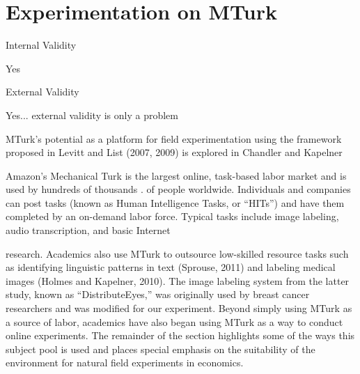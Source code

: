 \documentclass[12pt]{article}
\begin{document}
\citet{Foschi1996}
\citet{Dixon2015}
\citet{Cheng2011}
\citet{Bortolussi2010}
\citet{Borsuk2009}
\citet{Bobbit-Zeher2011}
\citet{Barnes2015}
\citet{Alexander2014}
\citet{Alexander1993}
\citet{Ridgeway1997}
\citet{Yampbell2005}
\citet{VanDijk2014}
\citet{VandenBrink2012}
\citet{Uscinski2011}
\citet{Tregenza2002}
\citet{Top1991}
\citet{Paludi1983}
\citet{Lloyd1990}
\citet{Lena2014}
\citet{Leemans1992}
\citet{Johnston2014}
\citet{Haswell1996}
\citet{Gorman2005}
\citet{Fulton2012}
\citet{Foschi2000}





\section{Experimentation on MTurk}\label{sec:mturk}

Internal Validity

Yes

External Validity

Yes... external validity is only a problem

MTurk’s potential as a platform for field experimentation using the framework proposed in Levitt and List (2007, 2009) is explored in Chandler and Kapelner

Amazon’s Mechanical Turk \citep{MTurkWebsite} is the largest online, task-based labor market and is used by hundreds of thousands \citep{Shank2015}.
of people worldwide. Individuals and companies can post tasks (known as Human Intelligence Tasks, or “HITs”) and have
them completed by an on-demand labor force. Typical tasks include image labeling, audio transcription, and basic Internet

research. Academics also use MTurk to outsource low-skilled resource tasks such as identifying linguistic patterns in text
(Sprouse, 2011) and labeling medical images (Holmes and Kapelner, 2010). The image labeling system from the latter study,
known as “DistributeEyes,” was originally used by breast cancer researchers and was modified for our experiment.
Beyond simply using MTurk as a source of labor, academics have also began using MTurk as a way to conduct online
experiments. The remainder of the section highlights some of the ways this subject pool is used and places special emphasis
on the suitability of the environment for natural field experiments in economics.


\citet{Berinsky2012}
\citet{Buhrmester2011}
\citet{Henrich2010}
\citet{Paolacci2010}
\citet{Gneezy2006}
\citet{Levitt2007}
\citet{Levitt2009}
\citet{Kapelner2010}
\citet{Chandler2013}
\citet{Horton2010}
\citet{Harrison2004}
\end{document}
